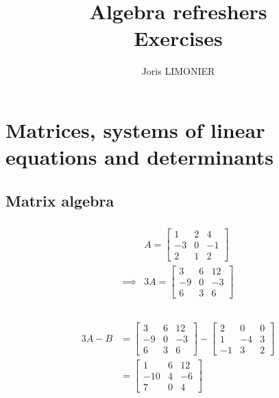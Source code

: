 \documentclass{article}
\title{Algebra refreshers\\Exercises}
\author{Joris LIMONIER}
\begin{document}
\maketitle

\tableofcontents

\setcounter{section}{4}
\section{Matrices, systems of linear equations and determinants}
\subsection{Matrix algebra}
\subsubsection{}
\begin{align*}
             & A
    = \begin{bmatrix}
        1  & 2 & 4  \\
        -3 & 0 & -1 \\
        2  & 1 & 2
    \end{bmatrix} \\
    \implies & 3A
    = \begin{bmatrix}
        3  & 6 & 12 \\
        -9 & 0 & -3 \\
        6  & 3 & 6
    \end{bmatrix} \\
\end{align*}

\subsubsection{}
\begin{align*}
    3A - B & =
    \begin{bmatrix}
        3  & 6 & 12 \\
        -9 & 0 & -3 \\
        6  & 3 & 6
    \end{bmatrix} -
    \begin{bmatrix}
        2  & 0  & 0 \\
        1  & -4 & 3 \\
        -1 & 3  & 2
    \end{bmatrix} \\
           & =
    \begin{bmatrix}
        1   & 6 & 12 \\
        -10 & 4 & -6 \\
        7   & 0 & 4
    \end{bmatrix}
\end{align*}
\end{document}
